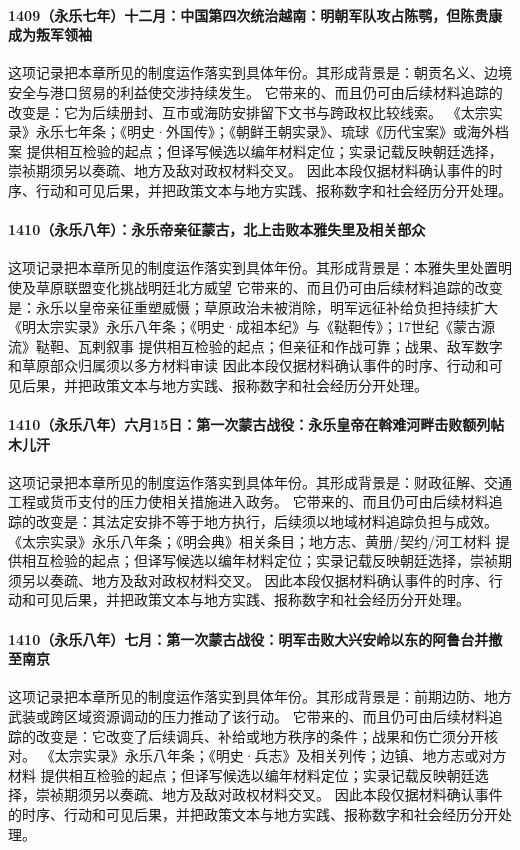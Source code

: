 \paragraph{1409（永乐七年）十二月：中国第四次统治越南：明朝军队攻占陈鹗，但陈贵康成为叛军领袖} 这项记录把本章所见的制度运作落实到具体年份。其形成背景是：朝贡名义、边境安全与港口贸易的利益使交涉持续发生。 它带来的、而且仍可由后续材料追踪的改变是：它为后续册封、互市或海防安排留下文书与跨政权比较线索。 《太宗实录》永乐七年条；《明史·外国传》；《朝鲜王朝实录》、琉球《历代宝案》或海外档案 提供相互检验的起点；但译写候选以编年材料定位；实录记载反映朝廷选择，崇祯期须另以奏疏、地方及敌对政权材料交叉。 因此本段仅据材料确认事件的时序、行动和可见后果，并把政策文本与地方实践、报称数字和社会经历分开处理。

\paragraph{1410（永乐八年）：永乐帝亲征蒙古，北上击败本雅失里及相关部众} 这项记录把本章所见的制度运作落实到具体年份。其形成背景是：本雅失里处置明使及草原联盟变化挑战明廷北方威望 它带来的、而且仍可由后续材料追踪的改变是：永乐以皇帝亲征重塑威慑；草原政治未被消除，明军远征补给负担持续扩大 《明太宗实录》永乐八年条；《明史·成祖本纪》与《鞑靼传》；17世纪《蒙古源流》鞑靼、瓦剌叙事 提供相互检验的起点；但亲征和作战可靠；战果、敌军数字和草原部众归属须以多方材料审读 因此本段仅据材料确认事件的时序、行动和可见后果，并把政策文本与地方实践、报称数字和社会经历分开处理。

\paragraph{1410（永乐八年）六月15日：第一次蒙古战役：永乐皇帝在斡难河畔击败额列帖木儿汗} 这项记录把本章所见的制度运作落实到具体年份。其形成背景是：财政征解、交通工程或货币支付的压力使相关措施进入政务。 它带来的、而且仍可由后续材料追踪的改变是：其法定安排不等于地方执行，后续须以地域材料追踪负担与成效。 《太宗实录》永乐八年条；《明会典》相关条目；地方志、黄册/契约/河工材料 提供相互检验的起点；但译写候选以编年材料定位；实录记载反映朝廷选择，崇祯期须另以奏疏、地方及敌对政权材料交叉。 因此本段仅据材料确认事件的时序、行动和可见后果，并把政策文本与地方实践、报称数字和社会经历分开处理。

\paragraph{1410（永乐八年）七月：第一次蒙古战役：明军击败大兴安岭以东的阿鲁台并撤至南京} 这项记录把本章所见的制度运作落实到具体年份。其形成背景是：前期边防、地方武装或跨区域资源调动的压力推动了该行动。 它带来的、而且仍可由后续材料追踪的改变是：它改变了后续调兵、补给或地方秩序的条件；战果和伤亡须分开核对。 《太宗实录》永乐八年条；《明史·兵志》及相关列传；边镇、地方志或对方材料 提供相互检验的起点；但译写候选以编年材料定位；实录记载反映朝廷选择，崇祯期须另以奏疏、地方及敌对政权材料交叉。 因此本段仅据材料确认事件的时序、行动和可见后果，并把政策文本与地方实践、报称数字和社会经历分开处理。

